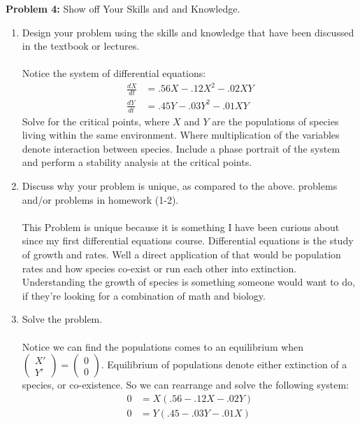 \documentclass[11pt]{article}
\newenvironment{problem}[1]{\textbf{Problem #1: }}{\newpage}
\begin{document}
	\begin{problem}{4}
		Show off Your Skills and and Knowledge.
		\begin{enumerate}[label = (\alph*)]
			\item Design your problem using the skills and knowledge that have been discussed in the textbook or lectures.
			\\ \\
			Notice the system of differential equations:
			\begin{align*}
				\frac{dX}{dt} &= .56X - .12X^2 - .02XY \\
				\frac{dY}{dt} &= .45Y - .03Y^2 - .01XY
			\end{align*}
			Solve for the critical points, where $X$ and $Y$ are the populations of species living within the same environment.  Where multiplication of the variables denote interaction between species.  Include a phase portrait of the system and perform a stability analysis at the critical points.
			\item  Discuss why your problem is unique, as compared to the above.
			problems and/or problems in homework (1-2).
			\\ \\
			This Problem is unique because it is something I have been curious about since my first differential equations course.  Differential equations is the study of growth and rates.  Well a direct application of that would be population rates and how species co-exist or run each other into extinction.  Understanding the growth of species is something someone would want to do, if they're looking for a combination of math and biology.
			\item  Solve the problem.
			\\ \\
			Notice we can find the populations comes to an equilibrium when $\begin{pmatrix}
				X' \\ Y' 
			\end{pmatrix} = \begin{pmatrix}
				0 \\ 0
			\end{pmatrix}$.  Equilibrium of populations denote either extinction of a species, or co-existence.  So we can rearrange and solve the following system:
			\begin{align*}
				0 &= X(.56 - .12X - .02Y) \\
				0 &= Y(.45 - .03Y - .01X)
			\end{align*}  

\end{enumerate}
\end{problem}
\end{document}

